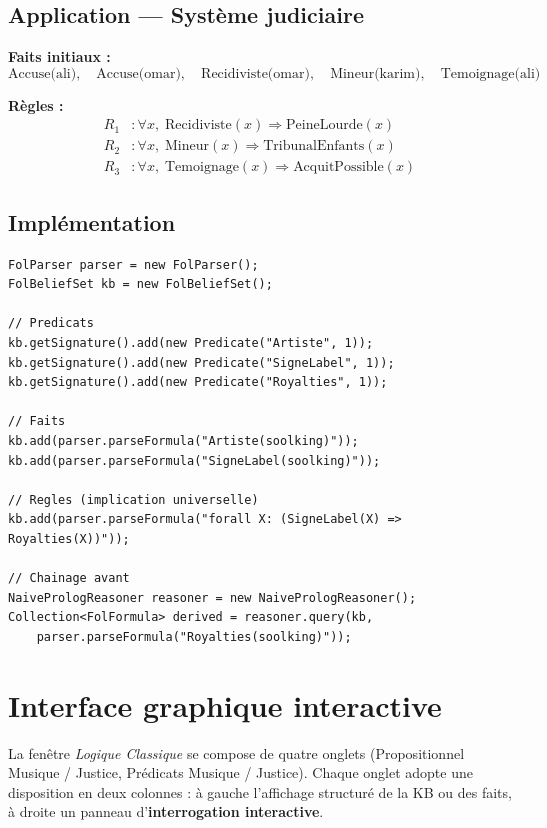 \subsection{Application — Système judiciaire}

\textbf{Faits initiaux :}
\[
  \text{Accuse(ali)},\quad \text{Accuse(omar)},\quad \text{Recidiviste(omar)},\quad
  \text{Mineur(karim)},\quad \text{Temoignage(ali)}
\]

\textbf{Règles :}
\begin{align*}
R_1&: \forall x,\; \text{Recidiviste}(x) \Rightarrow \text{PeineLourde}(x) \\
R_2&: \forall x,\; \text{Mineur}(x) \Rightarrow \text{TribunalEnfants}(x) \\
R_3&: \forall x,\; \text{Temoignage}(x) \Rightarrow \text{AcquitPossible}(x)
\end{align*}

\subsection{Implémentation}

\begin{lstlisting}[caption={Chaînage avant avec Tweety FOL}]
FolParser parser = new FolParser();
FolBeliefSet kb = new FolBeliefSet();

// Predicats
kb.getSignature().add(new Predicate("Artiste", 1));
kb.getSignature().add(new Predicate("SigneLabel", 1));
kb.getSignature().add(new Predicate("Royalties", 1));

// Faits
kb.add(parser.parseFormula("Artiste(soolking)"));
kb.add(parser.parseFormula("SigneLabel(soolking)"));

// Regles (implication universelle)
kb.add(parser.parseFormula("forall X: (SigneLabel(X) => Royalties(X))"));

// Chainage avant
NaivePrologReasoner reasoner = new NaivePrologReasoner();
Collection<FolFormula> derived = reasoner.query(kb,
    parser.parseFormula("Royalties(soolking)"));
\end{lstlisting}

\section{Interface graphique interactive}

La fenêtre \emph{Logique Classique} se compose de quatre onglets (Propositionnel
Musique / Justice, Prédicats Musique / Justice). Chaque onglet adopte une
disposition en deux colonnes : à gauche l'affichage structuré de la KB ou des
faits, à droite un panneau d'\textbf{interrogation interactive}.

